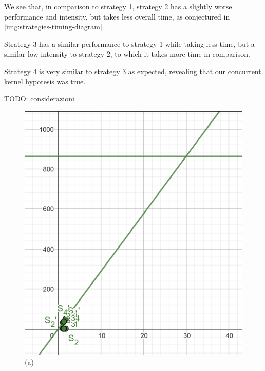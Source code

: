 We see that, in comparison to strategy 1, strategy 2 has a slightly worse performance and intensity, but takes less overall time, as conjectured in \ref{img:strategies-timing-diagram}.

Strategy 3 has a similar performance to strategy 1 while taking less time, but a similar low intensity to strategy 2, to which it takes more time in comparison.

Strategy 4 is very similar to strategy 3 as expected, revealing that our concurrent kernel hypotesis was true.

TODO: considerazioni


\begin{figure}[h]
	\centering
	\includegraphics[width=\textwidth]{images/roofline-overview}
	\caption*{(a)}
	\endminipage\hfill

\end{figure}
